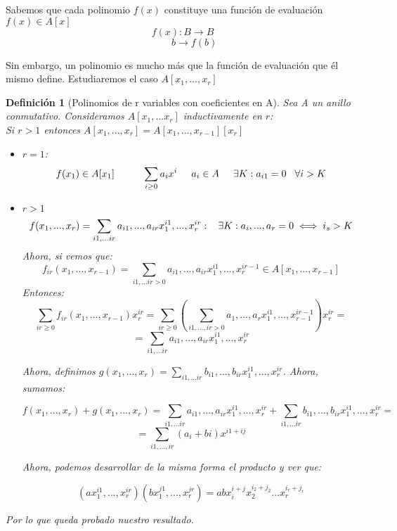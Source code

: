 \documentclass[11pt, a4paper, titlepage]{article}
\makeatletter
\renewenvironment{proof}[1][\proofname] {\vspace{-15pt}\par\pushQED{\qed}\normalfont\topsep6\p@\@plus6\p@\relax\trivlist\item[\hskip\labelsep\it#1\@addpunct{.}]\ignorespaces}{\popQED\endtrivlist\@endpefalse}
\theoremstyle{theorem-style}
\theoremstyle{definition-style}
\newtheorem*{ndef}{Definición}
\theoremstyle{remark-style}
\theoremstyle{example-style}
\makeatother
\begin{document}
Sabemos que cada polinomio $f(x)$ constituye una función de evaluación $f(x) \in A[x]$
\[
f(x):B \to B
\]
\[
\hspace{1cm}b \to f(b)
\]

Sin embargo, un polinomio es mucho más que la función de evaluación que él mismo define. Estudiaremos el caso $A[x_1,...,x_r]$

\begin{ndef}[Polinomios de r variables con coeficientes en A]
Sea A un anillo conmutativo. Consideramos $A[x_1,...x_r]$ inductivamente en $r$:\\
Si $r>1$ entonces $A[x_1,...,x_r] = A[x_1,...,x_{r-1}][x_r]$\\
	
\begin{proof}\hfill 

\begin{itemize}

	\item $r=1$:
\[
f(x_1) \in A[x_1] \hspace{1cm} \sum_{i \geq 0}a_i x^i \hspace{0.5cm} a_i \in A \hspace{0.5cm} \exists K: a_{i1} = 0 \hspace{0.3cm} \forall i > K
\]
	\item $r> 1$
\[
f(x_1,...,x_r) = \sum_{i1,...ir} a_{i1},...,a_{ir} x_1^{i1},...,x_r^{ir}: \hspace{0.3cm} \exists K: a_i,...,a_r  = 0 \iff i_s > K
\]
Ahora, si vemos que:
\[
f_{ir}(x_1,...,x_{r-1}) = \sum_{i1,...ir > 0} a_{i1},...,a_{ir} x_1^{i1},...,x_r^{ir-1} \in A[x_1,...,x_{r-1}]
\]
Entonces:
\[
\sum_{ir \geq 0} f_{ir}(x_1,...,x_{r-1})x_r^{ir}= \sum_{ir \geq 0}(\sum_{i1,...,ir > 0}a_1,...,a_r x_1^{i1},...,x_{r-1}^{ir-1})x_r^{ir} = 
\]
\[
=\sum_{i1,...ir} a_{i1},...,a_{ir} x_1^{i1},...,x_r^{ir}
\]


Ahora, definimos $g(x_1,...,x_r) = \sum_{i1,...ir} b_{i1},...,b_{ir} x_1^{i1},...,x_r^{ir}$. Ahora, sumamos:

\[
f(x_1,...,x_r)+g(x_1,...,x_r) = \sum_{i1,...ir} a_{i1},...,a_{ir} x_1^{i1},...,x_r^{ir} + \sum_{i1,...ir} b_{i1},...,b_{ir} x_1^{i1},...,x_r^{ir} = 
\]
\[
 = \sum_{i1,...,ir} (a_i+bi)x^{i1+ij}
\]

Ahora, podemos desarrollar de la misma forma el producto y ver que:

\[
(ax_1^{i1},...,x_r^{ir})(bx_1^{j1},...,x_r^{jr}) = abx_i^{i+j}x_2^{i_2+j_2}...x_r^{i_r+j_r}
\]

\end{itemize}
Por lo que queda probado nuestro resultado.
\end{proof}

\end{ndef}
\end{document}
